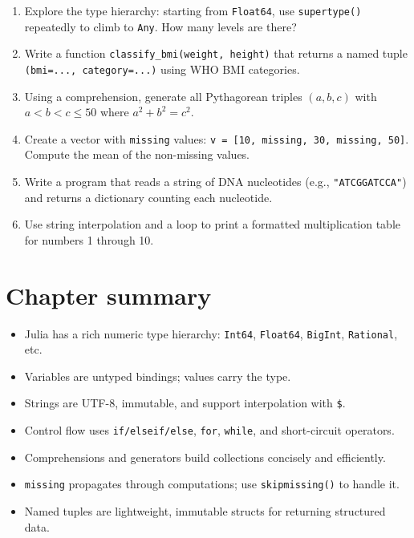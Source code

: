 \begin{exercise}
\begin{enumerate}
  \item Explore the type hierarchy: starting from \texttt{Float64}, use \texttt{supertype()} repeatedly to climb to \texttt{Any}. How many levels are there?
  \item Write a function \texttt{classify\_bmi(weight, height)} that returns a named tuple \texttt{(bmi=..., category=...)} using WHO BMI categories.
  \item Using a comprehension, generate all Pythagorean triples $(a, b, c)$ with $a < b < c \leq 50$ where $a^2 + b^2 = c^2$.
  \item Create a vector with \texttt{missing} values: \texttt{v = [10, missing, 30, missing, 50]}. Compute the mean of the non-missing values.
  \item Write a program that reads a string of DNA nucleotides (e.g., \texttt{"ATCGGATCCA"}) and returns a dictionary counting each nucleotide.
  \item Use string interpolation and a loop to print a formatted multiplication table for numbers 1 through 10.
\end{enumerate}
\end{exercise}

\section{Chapter summary}

\begin{itemize}
  \item Julia has a rich numeric type hierarchy: \texttt{Int64}, \texttt{Float64}, \texttt{BigInt}, \texttt{Rational}, etc.
  \item Variables are untyped bindings; values carry the type.
  \item Strings are UTF-8, immutable, and support interpolation with \texttt{\$}.
  \item Control flow uses \texttt{if/elseif/else}, \texttt{for}, \texttt{while}, and short-circuit operators.
  \item Comprehensions and generators build collections concisely and efficiently.
  \item \texttt{missing} propagates through computations; use \texttt{skipmissing()} to handle it.
  \item Named tuples are lightweight, immutable structs for returning structured data.
\end{itemize}
